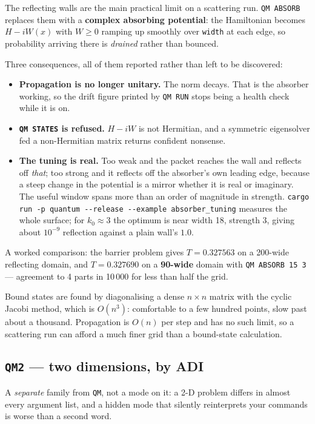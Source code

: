 \documentclass[11pt]{article}
\newcommand{\kw}[1]{\texttt{\uppercase{#1}}}
\newcommand{\code}[1]{\texttt{#1}}
\begin{document}
The reflecting walls are the main practical limit on a scattering run.
\code{QM ABSORB} replaces them with a \textbf{complex absorbing
potential}: the Hamiltonian becomes $H - iW(x)$ with $W\ge0$ ramping up
smoothly over \code{width} at each edge, so probability arriving there is
\emph{drained} rather than bounced.

Three consequences, all of them reported rather than left to be
discovered:

\begin{itemize}
\item \textbf{Propagation is no longer unitary.} The norm decays. That is
      the absorber working, so the drift figure printed by \code{QM RUN}
      stops being a health check while it is on.
\item \textbf{\code{QM STATES} is refused.} $H-iW$ is not Hermitian, and a
      symmetric eigensolver fed a non-Hermitian matrix returns confident
      nonsense.
\item \textbf{The tuning is real.} Too weak and the packet reaches the
      wall and reflects off \emph{that}; too strong and it reflects off
      the absorber's own leading edge, because a steep change in the
      potential is a mirror whether it is real or imaginary. The useful
      window spans more than an order of magnitude in strength.
      \code{cargo run -p quantum -{}-release -{}-example absorber\_tuning}
      measures the whole surface; for $k_0\approx3$ the optimum is near
      width 18, strength 3, giving about $10^{-9}$ reflection against a
      plain wall's $1.0$.
\end{itemize}

A worked comparison: the barrier problem gives $T = 0.327563$ on a
200-wide reflecting domain, and $T = 0.327690$ on a \textbf{90-wide}
domain with \code{QM ABSORB 15 3} --- agreement to 4 parts in 10\,000 for
less than half the grid.

Bound states are found by diagonalising a dense $n\times n$ matrix with
the cyclic Jacobi method, which is $O(n^3)$: comfortable to a few
hundred points, slow past about a thousand. Propagation is $O(n)$ per
step and has no such limit, so a scattering run can afford a much finer
grid than a bound-state calculation.

\subsection{\kw{qm2} --- two dimensions, by ADI}\label{sec:qm2}

A \emph{separate} family from \kw{qm}, not a mode on it: a 2-D problem
differs in almost every argument list, and a hidden mode that silently
reinterprets your commands is worse than a second word.
\end{document}
